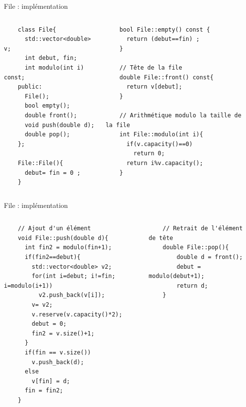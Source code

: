 \documentclass{beamer}
\begin{document}
\begin{frame}[fragile]{File : implémentation}
\begin{columns}
\begin{column}{0.5\linewidth}
    \begin{verbatim}
    class File{
      std::vector<double> v;
      int debut, fin;
      int modulo(int i) const;
    public:
      File();
      bool empty();
      double front();
      void push(double d);
      double pop();
    };
    
    File::File(){
      debut= fin = 0 ;
    }
    \end{verbatim}
\end{column}
\begin{column}{0.5\linewidth}   
    \begin{verbatim}
    bool File::empty() const {
      return (debut==fin) ;
    }
    
    // Tête de la file
    double File::front() const{
      return v[debut];
    }
    
    // Arithmétique modulo la taille de la file
    int File::modulo(int i){
      if(v.capacity()==0)
        return 0;
      return i%v.capacity();
    }
  \end{verbatim}
\end{column}
\end{columns}
\end{frame}

\begin{frame}[fragile]{File : implémentation}
\begin{columns}
\begin{column}{0.55\textwidth}
    \begin{verbatim}
    // Ajout d'un élément
    void File::push(double d){
      int fin2 = modulo(fin+1);
      if(fin2==debut){
        std::vector<double> v2;
        for(int i=debut; i!=fin; i=modulo(i+1))
          v2.push_back(v[i]);
        v= v2;
        v.reserve(v.capacity()*2);
        debut = 0;
        fin2 = v.size()+1;
      }
      if(fin == v.size())
        v.push_back(d);
      else
        v[fin] = d;
      fin = fin2;
    }
    \end{verbatim}
\end{column}
\begin{column}{0.45\textwidth}
    \begin{verbatim}
    // Retrait de l'élément de tête
    double File::pop(){
        double d = front();
        debut = modulo(debut+1);
        return d;
    }
    \end{verbatim}
\end{column}
\end{columns}
\end{frame}
\end{document}
